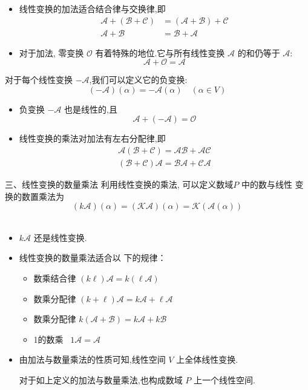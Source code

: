 \documentclass[13pt]{beamer}
\def\A{\mathscr{A}}
\def\O{\mathscr{O}}
\begin{document}
\begin{frame}
\begin{itemize}
	\item 线性变换的加法适合结合律与交换律,即
	\begin{align*}
	\mathscr{A}+(\mathscr{B}+\mathscr{C}) &=(\mathscr{A}+\mathscr{B})+\mathscr{C} \\
	\mathscr{A}+\mathscr{B} &=\mathscr{B}+\mathscr{A}
	\end{align*}
	\item 对于加法, 零变换 $\O$ 有着特殊的地位.它与所有线性变换 $\A$ 的和仍等于 $\A$:
	\[
	\A+\O=\mathscr{A}
	\]
\end{itemize}
\end{frame}

\begin{frame}
对于每个线性变换 $-\A$,我们可以定义它的负变换:
\[
(-\mathscr{A})({\alpha})=-\mathscr{A}({\alpha}) \quad({\alpha} \in V)
\]
\begin{itemize}
	\item 负变换 $-\A$ 也是线性的,且
	\[
	\A+(-\A)= \O
	\]
	\item 线性变换的乘法对加法有左右分配律,即
	\[
	\begin{array}{l}
	\mathscr{A}(\mathscr{B}+\mathscr{C})=\mathscr{A} \mathscr{B}+\mathscr{A} \mathscr{C} \\
	(\mathscr{B}+\mathscr{C}) \mathscr{A}=\mathscr{B} \mathscr{A}+\mathscr{C} \mathscr{A}
	\end{array}
	\]


\end{itemize}
\end{frame}

\begin{frame}{三、线性变换的数量乘法}
利用线性变换的乘法, 可以定义数域$P$ 中的数与线性 变换的数置乘法为
$$
(k \A)(\alpha)=(\mathscr{K} \A)(\alpha)=\mathscr{K}(\A(\alpha))
$$\\[-10pt]
\begin{itemize}
	\item $k \mathscr{A}$ 还是线性变换. 
	\item 线性变换的数量乘法适合以 下的规律：
\begin{itemize}
\item 数乘结合律 $(k \ell) \A=k(\ell \A)$
\item 数乘分配律 $({k}+\ell) \A={k} {\A}+\ell {\A}$
\item 数乘分配律 $k(\mathscr{A}+\mathscr{B})=k \mathscr{A}+k \mathscr{B}$
\item 1的数乘 \quad \, $1 \A=\A$
\end{itemize}
\item 
由加法与数量乘法的性质可知,线性空间 $V$ 上全体线性变换.  

对于如上定义的加法与数量乘法,也构成数域 $P$ 上一个线性空间.  
\end{itemize}


\end{frame}
\end{document}
